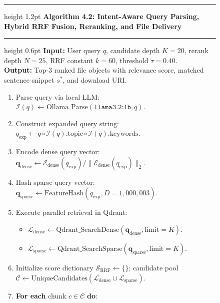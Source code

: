 \documentclass[a4paper,12pt]{article}
\begin{document}
\vspace{0.4em}
\begin{figure}[H]
\centering
\begin{minipage}{0.98\textwidth}
\hrule height 1.2pt
\vspace{0.3em}
\noindent\textbf{Algorithm 4.2: Intent-Aware Query Parsing, Hybrid RRF Fusion, Reranking, and File Delivery}
\vspace{0.3em}
\hrule height 0.6pt
\vspace{0.4em}
\small
\textbf{Input:} User query $q$, candidate depth $K=20$, rerank depth $N=25$, RRF constant $k=60$, threshold $\tau=0.40$.\\
\textbf{Output:} Top-3 ranked file objects with relevance score, matched sentence snippet $s^*$, and download URI.\\[0.4em]
\begin{enumerate}
    \setlength{\itemsep}{1.5pt}
    \setlength{\parskip}{0pt}
    \item Parse query via local LLM: $\mathcal{I}(q) \leftarrow \text{Ollama\_Parse}(\texttt{llama3.2:1b}, q)$.
    \item Construct expanded query string: $q_{\text{exp}} \leftarrow q \circ \mathcal{I}(q).\text{topic} \circ \mathcal{I}(q).\text{keywords}$.
    \item Encode dense query vector: $\mathbf{q}_{\text{dense}} \leftarrow \mathcal{E}_{\text{dense}}(q_{\text{exp}}) / \|\mathcal{E}_{\text{dense}}(q_{\text{exp}})\|_2$.
    \item Hash sparse query vector: $\mathbf{q}_{\text{sparse}} \leftarrow \text{FeatureHash}(q_{\text{exp}}, D=1,000,003)$.
    \item Execute parallel retrieval in Qdrant:
    \begin{itemize}
        \item $\mathcal{L}_{\text{dense}} \leftarrow \text{Qdrant\_SearchDense}(\mathbf{q}_{\text{dense}}, \text{limit}=K)$.
        \item $\mathcal{L}_{\text{sparse}} \leftarrow \text{Qdrant\_SearchSparse}(\mathbf{q}_{\text{sparse}}, \text{limit}=K)$.
    \end{itemize}
    \item Initialize score dictionary $\mathcal{S}_{\text{RRF}} \leftarrow \{\}$; candidate pool $\mathcal{C} \leftarrow \text{UniqueCandidates}(\mathcal{L}_{\text{dense}} \cup \mathcal{L}_{\text{sparse}})$.
    \item \textbf{For each} chunk $c \in \mathcal{C}$ \textbf{do}:
    \begin{itemize}

\end{itemize}
\end{enumerate}
\end{minipage}
\end{figure}
\end{document}
